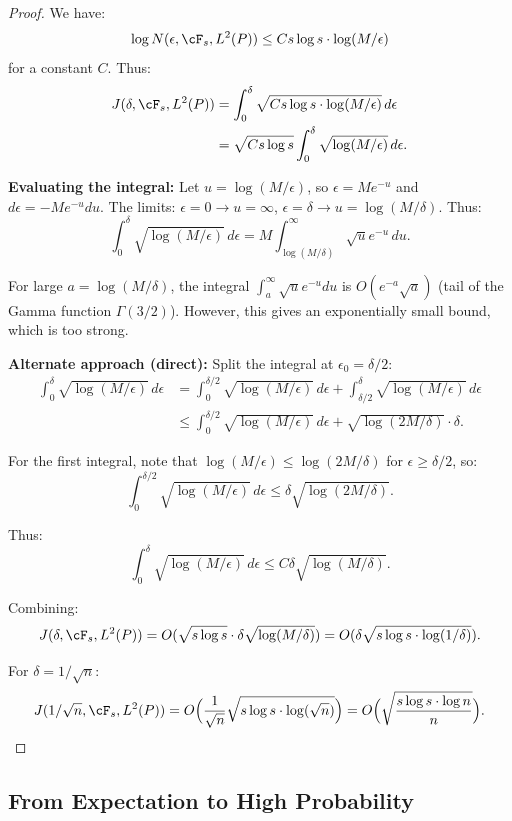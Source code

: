 \begin{proof}
We have:
\[
\log N(\epsilon, \cF_s, L^2(P)) \le C s \log s \cdot \log(M/\epsilon)
\]
for a constant $C$. Thus:
\begin{align*}
J(\delta, \cF_s, L^2(P))
&= \int_0^\delta \sqrt{C s \log s \cdot \log(M/\epsilon)} \, d\epsilon \\
&= \sqrt{C s \log s} \int_0^\delta \sqrt{\log(M/\epsilon)} \, d\epsilon.
\end{align*}

\textbf{Evaluating the integral:}
Let $u = \log(M/\epsilon)$, so $\epsilon = M e^{-u}$ and $d\epsilon = -M e^{-u} du$. The limits: $\epsilon = 0 \to u = \infty$, $\epsilon = \delta \to u = \log(M/\delta)$. Thus:
\[
\int_0^\delta \sqrt{\log(M/\epsilon)} \, d\epsilon = M \int_{\log(M/\delta)}^\infty \sqrt{u} e^{-u} \, du.
\]

For large $a = \log(M/\delta)$, the integral $\int_a^\infty \sqrt{u} e^{-u} du$ is $O(e^{-a} \sqrt{a})$ (tail of the Gamma function $\Gamma(3/2)$). However, this gives an exponentially small bound, which is too strong.

\textbf{Alternate approach (direct):}
Split the integral at $\epsilon_0 = \delta / 2$:
\begin{align*}
\int_0^\delta \sqrt{\log(M/\epsilon)} \, d\epsilon
&= \int_0^{\delta/2} \sqrt{\log(M/\epsilon)} \, d\epsilon + \int_{\delta/2}^\delta \sqrt{\log(M/\epsilon)} \, d\epsilon \\
&\le \int_0^{\delta/2} \sqrt{\log(M/\epsilon)} \, d\epsilon + \sqrt{\log(2M/\delta)} \cdot \delta.
\end{align*}

For the first integral, note that $\log(M/\epsilon) \le \log(2M/\delta)$ for $\epsilon \ge \delta/2$, so:
\[
\int_0^{\delta/2} \sqrt{\log(M/\epsilon)} \, d\epsilon \le \delta \sqrt{\log(2M/\delta)}.
\]

Thus:
\[
\int_0^\delta \sqrt{\log(M/\epsilon)} \, d\epsilon \le C \delta \sqrt{\log(M/\delta)}.
\]

Combining:
\[
J(\delta, \cF_s, L^2(P)) = O(\sqrt{s \log s} \cdot \delta \sqrt{\log(M/\delta)}) = O(\delta \sqrt{s \log s \cdot \log(1/\delta)}).
\]

For $\delta = 1/\sqrt{n}$:
\[
J(1/\sqrt{n}, \cF_s, L^2(P)) = O\Bigl( \frac{1}{\sqrt{n}} \sqrt{s \log s \cdot \log(\sqrt{n})} \Bigr) = O\Bigl( \sqrt{\frac{s \log s \cdot \log n}{n}} \Bigr).
\]
\end{proof}

\subsection{From Expectation to High Probability}

